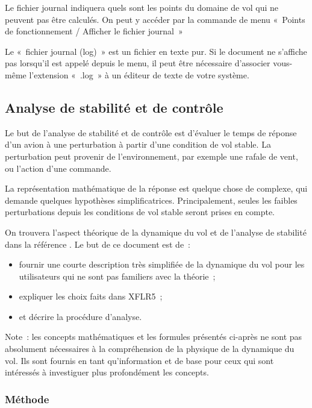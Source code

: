 \documentclass[a4paper,twoside,12pt,dvips]{article}
\begin{document}
Le fichier journal indiquera quels sont les points du domaine de vol qui ne 
peuvent pas être calculés. On peut y accéder par la commande de menu «~Points
de fonctionnement / Afficher le fichier journal~»

Le «~fichier journal (log)~» est un fichier en texte pur. Si le document ne 
s’affiche pas lorsqu’il est appelé depuis le menu, il peut être nécessaire 
d’associer vous-même l’extension «~.log~» à un éditeur de texte de votre système.

\subsection{Analyse de stabilité et de contrôle}

Le but de l’analyse de stabilité et de contrôle est d’évaluer le temps de réponse d’un avion à une perturbation à partir d’une condition de vol stable. La perturbation peut provenir de l’environnement, par exemple une rafale de vent, ou l’action d’une commande.

La représentation mathématique de la réponse est quelque chose de complexe, qui demande quelques hypothèses simplificatrices. Principalement, seules les faibles perturbations depuis les conditions de vol stable seront prises en compte.

On trouvera l’aspect théorique de la dynamique du vol et de l’analyse de  stabilité dans la référence \cite{Sivells47}. Le but de ce document est de~:

\begin{itemize}
	\item fournir une courte description très simplifiée de la dynamique du vol
	pour les utilisateurs qui ne sont pas familiers avec la théorie~;
	\item expliquer les choix faits dans XFLR5~;
	\item et décrire la procédure d’analyse.
\end{itemize}

Note~: les concepts mathématiques et les formules présentés ci-après ne sont pas absolument nécessaires à la compréhension de la physique de la dynamique du vol. Ils sont fournis en tant qu’information et de base pour ceux qui sont intéressés à investiguer plus profondément les concepts.

\subsubsection{Méthode}
\end{document}
